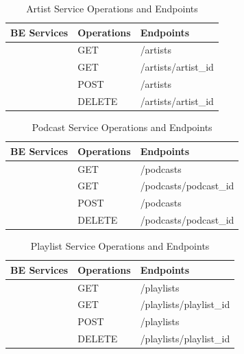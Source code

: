 \documentclass[a4paper,12pt]{article}
\begin{document}
\begin{table}[H]
    \centering
    \renewcommand{\arraystretch}{1.2}
    \begin{tabular}{|>{\centering\arraybackslash}m{4cm}|m{3cm}|m{7cm}|}
    \hline
    \textbf{BE Services} & \textbf{Operations} & \textbf{Endpoints} \\
    \hline
    \multirow{4}{*}{\textbf{Artist Service}} 
    & GET & /artists \\
    & GET & /artists/{artist\_id} \\
    & POST & /artists \\
    & DELETE & /artists/{artist\_id} \\
    \hline
    \end{tabular}
    \caption{Artist Service Operations and Endpoints}
\end{table}

\begin{table}[H]
    \centering
    \renewcommand{\arraystretch}{1.2}
    \begin{tabular}{|>{\centering\arraybackslash}m{4cm}|m{3cm}|m{7cm}|}
    \hline
    \textbf{BE Services} & \textbf{Operations} & \textbf{Endpoints} \\
    \hline
    \multirow{4}{*}{\textbf{Podcast Service}} 
    & GET & /podcasts \\
    & GET & /podcasts/{podcast\_id} \\
    & POST & /podcasts \\
    & DELETE & /podcasts/{podcast\_id} \\
    \hline
    \end{tabular}
    \caption{Podcast Service Operations and Endpoints}
\end{table}

\begin{table}[H]
    \centering
    \renewcommand{\arraystretch}{1.2}
    \begin{tabular}{|>{\centering\arraybackslash}m{4cm}|m{3cm}|m{7cm}|}
    \hline
    \textbf{BE Services} & \textbf{Operations} & \textbf{Endpoints} \\
    \hline
    \multirow{4}{*}{\textbf{Playlist Service}} 
    & GET & /playlists \\
    & GET & /playlists/{playlist\_id} \\
    & POST & /playlists \\
    & DELETE & /playlists/{playlist\_id} \\
    \hline
    \end{tabular}
    \caption{Playlist Service Operations and Endpoints}
\end{table}
\end{document}
